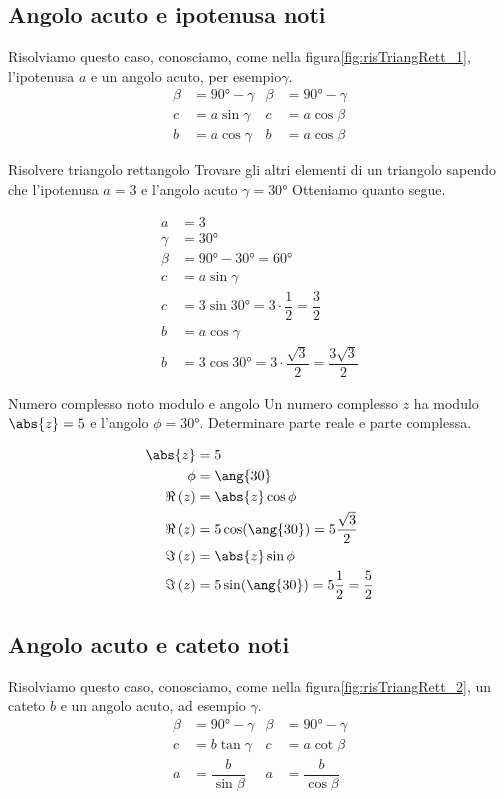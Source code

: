 \subsection{Angolo acuto e ipotenusa noti}
Risolviamo questo caso, conosciamo, come nella figura\nobs\vref{fig:risTriangRett_1}, l'ipotenusa $a$ e un angolo acuto, per esempio\nobs$\gamma$.
\begin{align*}
\beta&=\ang{90}-\gamma&\beta&=\ang{90}-\gamma\\
c&=a\sin\gamma&c&=a\cos\beta\\
b&=a\cos\gamma&b&=a\cos\beta
\end{align*}
\begin{esempiot}{Risolvere triangolo rettangolo}{}
Trovare gli altri elementi di un triangolo sapendo che l'ipotenusa $a=3$ e l'angolo acuto $\gamma=\ang{30}$  Otteniamo quanto segue.
\end{esempiot}
\begin{align*}
a&=3\\
\gamma&=\ang{30}\\
\beta&=\ang{90}-\ang{30}=\ang{60}\\
c&=a\sin\gamma\\
c&=3\sin\ang{30}=3\cdot\dfrac{1}{2}=\dfrac{3}{2}\\
b&=a\cos\gamma\\
b&=3\cos\ang{30}=3\cdot\dfrac{\sqrt{3}}{2}=\dfrac{3\sqrt{3}}{2}
\end{align*}
\begin{esempiot}{Numero complesso noto modulo e angolo }{}
	Un numero complesso $z$ ha modulo $\abs{z}=5$ e l'angolo $\phi=\ang{30}$.  Determinare parte reale e parte complessa.
\end{esempiot}
\begin{align*}
\abs{z}&=5\\
\phi&=\ang{30}\\
\Re\left(z\right)&=\abs{z}\cos\phi\\
\Re\left(z\right)&=5\cos(\ang{30})=5\frac{\sqrt{3}}{2}\\
\Im\left(z\right)&=\abs{z}\sin\phi\\
\Im\left(z\right)&=5\sin(\ang{30})=5\dfrac{1}{2}=\dfrac{5}{2}\\
\end{align*}
\subsection{Angolo acuto e cateto noti}
Risolviamo questo caso, conosciamo, come nella figura\nobs\vref{fig:risTriangRett_2}, un cateto $b$ e un angolo acuto, ad esempio $\gamma$.
\begin{align*}
\beta&=\ang{90}-\gamma&\beta&=\ang{90}-\gamma\\
c&=b\tan\gamma&c&=a\cot\beta\\
a&=\dfrac{b}{\sin\beta}&a&=\dfrac{b}{\cos\beta}
\end{align*}

